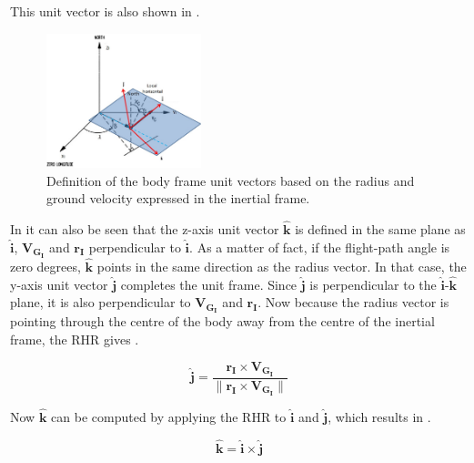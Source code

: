 \noindent
This unit vector is also shown in .

 \begin{figure}[H]
\centering
\includegraphics[width=0.4\textwidth]{figures/reference_frames/cartesian_transformation_mooij1994motion.jpg}
\caption{Definition of the body frame unit vectors based on the radius and ground velocity expressed in the inertial frame. \citep{mooij1994motion}}
\label{fig:cartesian_transformation_mooij1994motion}
\end{figure}

\noindent
In  it can also be seen that the z-axis unit vector $\mathbf{\hat{k}}$ is defined in the same plane as $\mathbf{\hat{i}}$, $\mathbf{V_{G_{I}}}$ and $\mathbf{r_{I}}$ perpendicular to $\mathbf{\hat{i}}$. As a matter of fact, if the flight-path angle is zero degrees, $\mathbf{\hat{k}}$ points in the same direction as the radius vector. In that case, the y-axis unit vector $\mathbf{\hat{j}}$ completes the unit frame. Since $\mathbf{\hat{j}}$ is perpendicular to the $\mathbf{\hat{i}}$-$\mathbf{\hat{k}}$ plane, it is also perpendicular to $\mathbf{V_{G_{I}}}$ and $\mathbf{r_{I}}$. Now because the radius vector is pointing through the centre of the body away from the centre of the inertial frame, the \ac{RHR} gives .


\begin{equation} \label{eq:jHat}
\mathbf{\hat{j}} = \dfrac{\mathbf{r_{I} \times \mathbf{V_{G_{I}}}}}{\| \mathbf{r_{I} \times \mathbf{V_{G_{I}}}} \|}
\end{equation}

\noindent
Now $\mathbf{\hat{k}}$ can be computed by applying the \ac{RHR} to $\mathbf{\hat{i}}$ and $\mathbf{\hat{j}}$, which results in .

\begin{equation} \label{eq:kHat}
\mathbf{\hat{k}} = \mathbf{\hat{i}} \times \mathbf{\hat{j}}
\end{equation}

